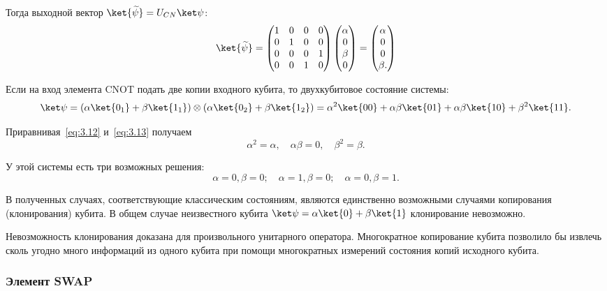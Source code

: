\documentclass[pscyr,notitlepage]{hedwork}
\newcommand{\eq}[1]{\eqref{eq:#1}}
\renewcommand{\~}[1]{\widetilde{#1}}
\newcommand{\lb}{\left(}
\newcommand{\rb}{\right)}
\begin{document}
  Тогда выходной вектор \( \ket{\~\psi} = U_{CN}\ket\psi \):
  \begin{equation}
    \ket{\~\psi} =
    \begin{pmatrix}
      1 & 0 & 0 & 0 \\
      0 & 1 & 0 & 0 \\
      0 & 0 & 0 & 1 \\
      0 & 0 & 1 & 0
    \end{pmatrix}
    \begin{pmatrix}
      \alpha \\ 0 \\ \beta \\ 0
    \end{pmatrix} =
    \begin{pmatrix}
      \alpha \\ 0 \\ 0 \\ \beta.
    \end{pmatrix}
    \label{eq:3.12}
  \end{equation}
  
  Если на вход элемента CNOT подать две копии входного кубита, то двухкубитовое
  состояние системы:
  \begin{equation}
    \ket\psi = \lb\alpha\ket{0_1} + \beta\ket{1_1}\rb \otimes
      \lb\alpha\ket{0_2} + \beta\ket{1_2}\rb =
      \alpha^2\ket{00} + \alpha\beta\ket{01} + \alpha\beta\ket{10} +
      \beta^2\ket{11}.
    \label{eq:3.13}
  \end{equation}
  
  Приравнивая~\eq{3.12} и~\eq{3.13} получаем
  \[
    \alpha^2 = \alpha, \quad \alpha\beta = 0, \quad \beta^2 = \beta.
  \]
  
  У этой системы есть три возможных решения:
  \[
    \alpha = 0, \beta = 0; \quad \alpha = 1, \beta = 0; \quad
      \alpha = 0, \beta = 1.
  \]
  
  В полученных случаях, соответствующие классическим состояниям, являются
  единственно возможными случаями копирования (клонирования) кубита. В общем
  случае неизвестного кубита \( \ket\psi = \alpha\ket{0} + \beta\ket{1} \)
  клонирование невозможно.
  
  Невозможность клонирования доказана для произвольного унитарного оператора.
  Многократное копирование кубита позволило бы извлечь сколь угодно много
  информаций из одного кубита при помощи многократных измерений состояния копий
  исходного кубита.~\cite{task}
  
  \subsubsection{Элемент SWAP}
  
\end{document}
